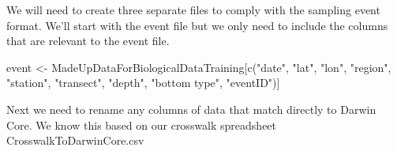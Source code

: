 \documentclass[
]{book}
\newenvironment{Shaded}{\begin{snugshade}}{\end{snugshade}}
\newcommand{\AttributeTok}[1]{\textcolor[rgb]{0.77,0.63,0.00}{#1}}
\newcommand{\ConstantTok}[1]{\textcolor[rgb]{0.00,0.00,0.00}{#1}}
\newcommand{\ControlFlowTok}[1]{\textcolor[rgb]{0.13,0.29,0.53}{\textbf{#1}}}
\newcommand{\FunctionTok}[1]{\textcolor[rgb]{0.00,0.00,0.00}{#1}}
\newcommand{\NormalTok}[1]{#1}
\newcommand{\OtherTok}[1]{\textcolor[rgb]{0.56,0.35,0.01}{#1}}
\newcommand{\SpecialCharTok}[1]{\textcolor[rgb]{0.00,0.00,0.00}{#1}}
\newcommand{\StringTok}[1]{\textcolor[rgb]{0.31,0.60,0.02}{#1}}
\begin{document}
\begin{Shaded}
\end{Shaded}

We will need to create three separate files to comply with the sampling event format.
We'll start with the event file but we only need to include the columns that are relevant
to the event file.

\begin{Shaded}
\begin{Highlighting}[]
\NormalTok{event }\OtherTok{\textless{}{-}}\NormalTok{ MadeUpDataForBiologicalDataTraining[}\FunctionTok{c}\NormalTok{(}\StringTok{"date"}\NormalTok{, }\StringTok{"lat"}\NormalTok{, }\StringTok{"lon"}\NormalTok{, }\StringTok{"region"}\NormalTok{, }\StringTok{"station"}\NormalTok{,}
                                               \StringTok{"transect"}\NormalTok{, }\StringTok{"depth"}\NormalTok{, }\StringTok{"bottom type"}\NormalTok{, }\StringTok{"eventID"}\NormalTok{)]}
\end{Highlighting}
\end{Shaded}

Next we need to rename any columns of data that match directly to Darwin Core. We know
this based on our crosswalk spreadsheet CrosswalkToDarwinCore.csv
\end{document}
